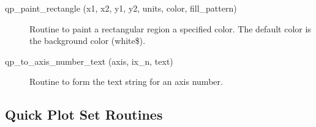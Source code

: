 \begin{description}
\label{r:qp.paint.rectangle}
\item[qp_paint_rectangle (x1, x2, y1, y2, units, color, fill_pattern)] \Newline 
Routine to paint a rectangular region a specified color.
The default color is the background color (white\$).

\label{r:qp.to.axis.number.text}
\item[qp_to_axis_number_text (axis, ix_n, text)] \Newline 
     Routine to form the text string for an axis number.

\end{description}

\subsection{Quick Plot Set Routines}

